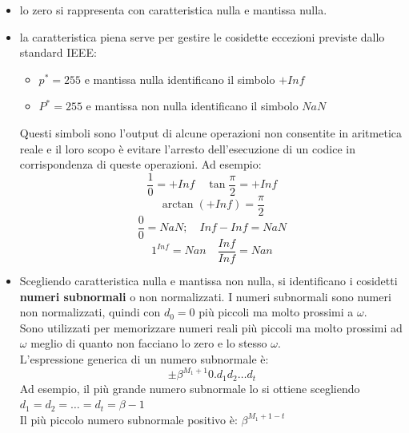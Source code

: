 \documentclass[12pt]{report}
\begin{document}
\begin{itemize}
	\item lo zero si rappresenta con caratteristica nulla e mantissa nulla.
	\item la caratteristica piena serve per gestire le cosidette eccezioni previste dallo standard IEEE:
	\begin{itemize}
		\item $p^* = 255$ e mantissa nulla identificano il simbolo $+Inf$
		\item $P^* = 255$ e mantissa non nulla identificano il simbolo $NaN$
	\end{itemize}
	Questi simboli sono l'output di alcune operazioni non consentite in aritmetica reale e il loro scopo è evitare l'arresto dell'esecuzione di un codice in corrispondenza di queste operazioni. Ad esempio:
	\[
	\frac{1}{0} = +Inf \quad \tan\frac{\pi}{2} = +Inf
	\]
	\[
	\arctan(+Inf) = \frac{\pi}{2}
	\]
	\[
	\frac{0}{0} = NaN; \quad Inf - Inf = NaN
	\]
	\[
	1^{Inf} = Nan \quad \frac{Inf}{Inf} = Nan
	\]
	\item Scegliendo caratteristica nulla e mantissa non nulla, si identificano i cosidetti \textbf{numeri subnormali} o  non normalizzati. I numeri subnormali sono numeri non normalizzati, quindi con $d_0 = 0$ più piccoli ma molto prossimi a $\omega$. \\
	Sono utilizzati per memorizzare numeri  reali più piccoli ma molto prossimi ad $\omega$ meglio di quanto non facciano lo zero e lo stesso $\omega$. \\
	L'espressione generica di un numero subnormale è:
	\[
	\pm \beta^{M_1 + 1}0.d_1d_2\dots d_t
	\]
	Ad esempio, il più grande numero subnormale lo si ottiene scegliendo $d_1 = d_2 = \dots = d_t = \beta - 1$ \\
	Il più piccolo numero subnormale positivo è: $\beta^{M_1 + 1 - t}$
\end{itemize}
\end{document}
